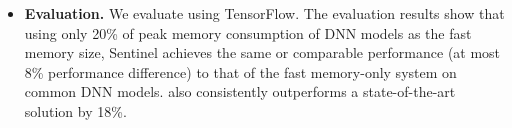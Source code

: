 \begin{itemize}
\item \textbf{Evaluation.} We evaluate \name using TensorFlow. The evaluation results show that using only 20\% of peak memory consumption of DNN models as the fast memory size, Sentinel achieves the same or comparable performance (at most 8\% performance difference) to that of the fast memory-only system on common DNN models. \name also consistently outperforms a state-of-the-art solution by 18\%.

 
\end{itemize}





\begin{comment}
CPU for machine learning. 

We focus on CPU as the training platform because of following reasons:
(1) The widespread deployment of CPUs makes this hardware platform an attractive target for machine learning model training. 
(2) The optimizations on GPU lack of generality. 
(3) In terms of programmability, porting the original
code to GPU kernels requires significant programming efforts; 
(4) GPU has strong bias towards certain application.
Existing effort has been made in academic and industry to optimize machine learning training on widely available CPU based architecture. Adam~\cite{Chilimbi:2014:PAB:2685048.2685094} from Microsoft. Intel MKL-DNN\cite{intelMKL} has been proposed to accelerate machine learning training. 

\end{comment}